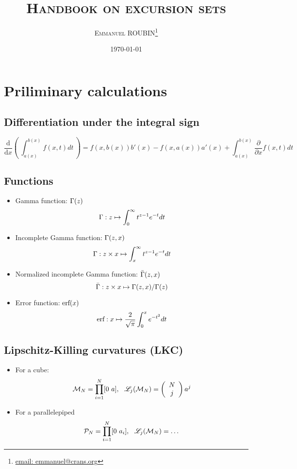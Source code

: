 \documentclass[12pt]{article}
\title{\textsc{Handbook on excursion sets}}
\date{\textsc{\today}}
\author{\textsc{Emmanuel ROUBIN\footnote{\url{email: emmanuel@crans.org}}}}
\begin{document}
\maketitle
\thispagestyle{empty}
\tableofcontents
\newpage
\section{Priliminary calculations}
\subsection{Differentiation under the integral sign}
\begin{equation}
  \frac{\text{d}}{\text{d}x}\left(\ \int_{a(x)}^{b(x)} f(x,t) dt \ \right) = f(x,b(x))b'(x)-f(x,a(x))a'(x)+\int_{a(x)}^{b(x)}\frac{\partial}{\partial x}f(x,t)dt
\end{equation}
\subsection{Functions}
\begin{itemize}
\item Gamma function: $\Gamma(z)$
  \begin{equation}
    \Gamma: z \mapsto \int_0^\infty t^{z-1}e^{-t} dt
  \end{equation}
\item Incomplete Gamma function: $\Gamma(z,x)$
  \begin{equation}
    \Gamma: z \times x \mapsto \int_x^\infty t^{z-1}e^{-t} dt
  \end{equation}
\item Normalized incomplete Gamma function: $\bar{\Gamma}(z,x)$
  \begin{equation}
    \bar{\Gamma}: z \times x \mapsto \Gamma(z,x)/\Gamma(z)
  \end{equation}
\item Error function: $\text{erf}(x)$
  \begin{equation}
    \text{erf}: x \mapsto \frac{2}{\sqrt\pi}\int_0^xe^{-t^2}dt
  \end{equation}
\end{itemize}
\subsection{Lipschitz-Killing curvatures (LKC)}
\begin{itemize}
  \item For a cube:
  \begin{equation}
    \MRF_N=\prod_{i=1}^{N}[0\ \Msize], \ \ \LKC_j(\MRF_N)= \left( \begin{array}{c} N \\ j \end{array} \right) \Msize^j
  \end{equation}
\item For a parallelepiped
  \begin{equation}
    \PRF_N=\prod_{i=1}^{N}[0\ \Msize_i], \ \ \LKC_j(\MRF_N)= \dots
  \end{equation}
\end{itemize}
\end{document}
